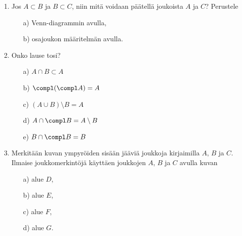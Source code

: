 \begin{enumerate}
\item Jos $A\subset B$ ja $B\subset C$, niin mitä voidaan päätellä joukoista $A$ ja $C$? Perustele 
\begin{itemize}
\item[a)] Venn-diagrammin avulla,
\item[b)] osajoukon määritelmän avulla.
\end{itemize}

\item
Onko lause tosi?
\begin{itemize}
\item[a)] $A \cap B \subset A$
\item[b)] $\compl (\compl A) = A$
\item[c)] $(A\cup B) \setminus B = A$
\item[d)] $A \cap \compl B = A \setminus B$
\item[e)] $B \cap \compl B = B$
\end{itemize}

\item Merkitään kuvan ympyröiden sisään jääviä joukkoja kirjaimilla $A$, $B$ ja $C$. Ilmaise joukkomerkintöjä käyttäen joukkojen $A$, $B$ ja $C$ avulla kuvan
\begin{itemize}
\item[a)] alue $D$,
\item[b)] alue $E$,
\item[c)] alue $F$,
\item[d)] alue $G$.
\end{itemize}

\medskip

\begin{center}



\end{center}


\end{enumerate}

